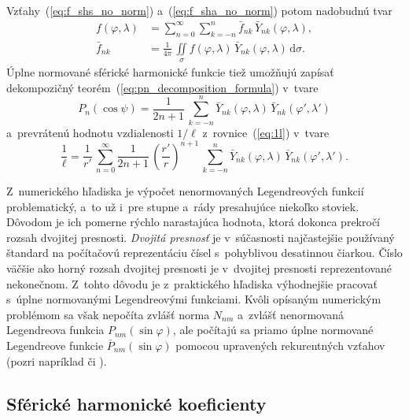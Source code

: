 \documentclass[a4paper, 12pt]{book}
\newcommand{\diff}{\mathrm d}
\begin{document}
Vzťahy~(\ref{eq:f_shs_no_norm}) a~(\ref{eq:f_sha_no_norm}) potom nadobudnú tvar
%
\begin{align}
\label{eq:f_shs}
f(\varphi, \lambda) &= \sum_{n = 0}^\infty \sum_{k = -n}^n \bar{f}_{nk} \,
\bar{Y}_{nk}(\varphi, \lambda){,}\\
%
\label{eq:f_sha}
\bar{f}_{nk} &= \frac{1}{4\pi} \, \iint\limits_{\sigma} f(\varphi, \lambda) \,
\bar{Y}_{nk}(\varphi, \lambda) \, \diff \sigma{.}
\end{align}
%
Úplne normované sférické harmonické funkcie tiež umožňujú zapísať dekompozičný
teorém~(\ref{eq:pn_decomposition_formula}) v~tvare
\parencite{MoritzPhysicalGeodesy}
%
\begin{equation}
P_n(\cos\psi) = \frac{1}{2n + 1} \, \sum_{k = -n}^n \bar{Y}_{nk}(\varphi,
\lambda) \, \bar{Y}_{nk}(\varphi', \lambda')
\end{equation}
%
a~prevrátenú hodnotu vzdialenosti $1 \slash \ell$ z~rovnice~(\ref{eq:1l}) 
v~tvare
%
\begin{equation}
\label{eq:1l_sh}
\frac{1}{\ell} = \frac{1}{r'} \, \sum_{n = 0}^{\infty} \frac{1}{2n + 1} \, 
\left( \frac{r'}{r} \right)^{n + 1} \, \sum_{k = -n}^n \bar{Y}_{nk}(\varphi,
\lambda) \, \bar{Y}_{nk}(\varphi', \lambda'){.}
\end{equation}

Z~numerického hľadiska je výpočet nenormovaných Legendreových funkcií 
problematický, a~to už i~pre stupne a~rády presahujúce niekoľko stoviek.  
Dôvodom je ich pomerne rýchlo narastajúca hodnota, ktorá dokonca prekročí 
rozsah dvojitej presnosti.  \emph{Dvojitá presnosť} je v~súčasnosti 
najčastejšie používaný štandard na počítačovú reprezentáciu čísel s~pohyblivou 
desatinnou čiarkou.  Číslo väčšie ako horný rozsah dvojitej presnosti je 
v~dvojitej presnosti reprezentované nekonečnom.  Z~tohto dôvodu je 
z~praktického hľadiska výhodnejšie pracovať s~úplne normovanými Legendreovými 
funkciami.  Kvôli opísaným numerickým problémom sa však nepočíta zvlášť norma 
$N_{nm}$ a~zvlášť nenormovaná Legendreova funkcia $P_{nm}(\sin\varphi)$, ale 
počítajú sa priamo úplne normované Legendreove funkcie 
$\bar{P}_{nm}(\sin\varphi)$ pomocou upravených rekurentných vzťahov (pozri 
napríklad \cite{Holmes2002a} či \cite{Fukushima2012a}).



\subsection{Sférické harmonické koeficienty}
\label{sec:shc_norm}
\end{document}

